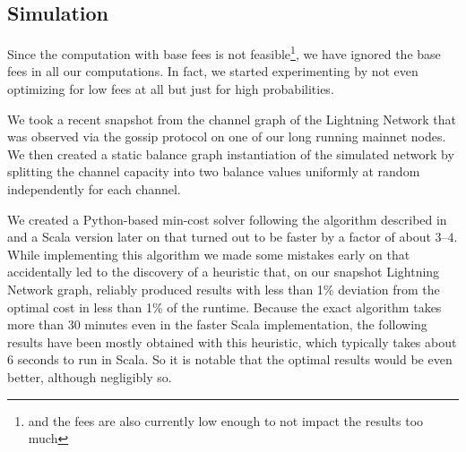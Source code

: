 \documentclass[10pt,twocolumn]{article}
\begin{document}
\subsection{Simulation}
Since the computation with base fees is not feasible\footnote{and the fees are also currently low enough to not impact the results too much}, we have ignored the base fees in all our computations.
In fact, we started experimenting by not even optimizing for low fees at all but just for high probabilities.

We took a recent snapshot from the channel graph of the Lightning Network that was observed via the gossip protocol on one of our long running mainnet nodes.
We then created a static balance graph instantiation of the simulated network by splitting the channel capacity into two balance values uniformly at random independently for each channel.

We created a Python-based min-cost solver following the algorithm described in~\cite[p.~556ff]{ahuja1993network} and a Scala version later on that turned out to be faster by a factor of about $3$--$4$.
While implementing this algorithm we made some mistakes early on that accidentally led to the discovery of a heuristic that, on our snapshot Lightning Network graph, reliably produced results with less than 1\% deviation from the optimal cost in less than 1\% of the runtime.
Because the exact algorithm takes more than 30 minutes even in the faster Scala implementation, the following results have been mostly obtained with this heuristic, which typically takes about 6 seconds to run in Scala. So it is notable that the optimal results would be even better, although negligibly so.
\end{document}
